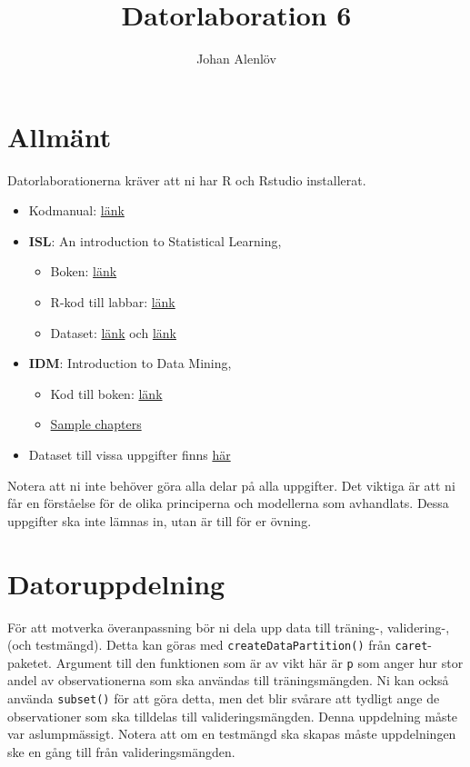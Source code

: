 \documentclass[a4paper]{article}
\title{Datorlaboration 6}
\author{Johan Alenlöv}
\begin{document}
\maketitle
\thispagestyle{fancy}


\section*{Allmänt}

Datorlaborationerna kräver att ni har R och Rstudio installerat.
\begin{itemize}
    \item Kodmanual: \href{https://www.isakhietala.com/teaching/732g12/}{länk}
    \item \textbf{ISL}: An introduction to Statistical Learning,
    \begin{itemize}
        \item Boken: \href{https://www.statlearning.com/}{länk}
        \item R-kod till labbar: \href{https://www.statlearning.com/resources-second-edition}{länk}
        \item Dataset: \href{https://cran.r-project.org/web/packages/ISLR2/index.html}{länk} och \href{https://www.statlearning.com/resources-second-edition}{länk}
    \end{itemize}
    \item \textbf{IDM}: Introduction to Data Mining,
    \begin{itemize}
        \item Kod till boken: \href{https://mhahsler.github.io/Introduction_to_Data_Mining_R_Examples/}{länk}
        \item \href{https://www-users.cse.umn.edu/~kumar001/dmbook/index.php#chapters}{Sample chapters}
    \end{itemize}
    \item Dataset till vissa uppgifter finns \href{https://github.com/STIMALiU/732G12_DM/tree/2023/data}{här}
\end{itemize}
Notera att ni inte behöver göra alla delar på alla uppgifter. Det viktiga är att ni får en förståelse för de olika principerna och modellerna som avhandlats. Dessa uppgifter ska inte lämnas in, utan är till för er övning.

\section*{Datoruppdelning}

För att motverka överanpassning bör ni dela upp data till träning-, validering-, (och testmängd). Detta kan göras med \texttt{createDataPartition()} från \texttt{caret}-paketet. Argument till den funktionen som är av vikt här är \texttt{p} som anger hur stor andel av observationerna som ska användas till träningsmängden. Ni kan också använda \texttt{subset()} för att göra detta, men det blir svårare att tydligt ange de observationer som ska tilldelas till valideringsmängden. Denna uppdelning måste var aslumpmässigt. Notera att om en testmängd ska skapas måste uppdelningen ske en gång till från valideringsmängden.
\end{document}

